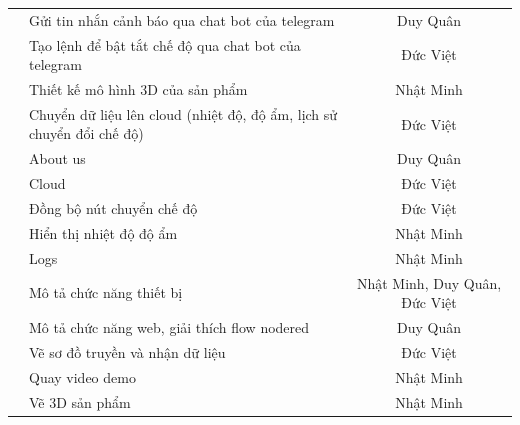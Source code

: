 \documentclass{report}
\begin{document}
\begin{table}[!h]
{\begin{tabular}{|c|l|c|}
    \rowcolor[HTML]{EBF1DE} 
    \cellcolor[HTML]{D8E4BC} & Gửi tin nhắn cảnh báo qua chat bot của telegram & Duy Quân \\ \cline{2-3} 
    \rowcolor[HTML]{EBF1DE} 
    \cellcolor[HTML]{D8E4BC} & Tạo lệnh để bật tắt chế độ qua chat bot của telegram & Đức Việt \\ \cline{2-3} 
    \rowcolor[HTML]{EBF1DE} 
    \cellcolor[HTML]{D8E4BC} & Thiết kế mô hình 3D của sản phẩm & Nhật Minh \\ \cline{2-3} 
    \rowcolor[HTML]{EBF1DE} 
    \cellcolor[HTML]{D8E4BC} & Chuyển dữ liệu lên cloud (nhiệt độ, độ ẩm, lịch sử chuyển đổi   chế độ) & Đức Việt \\ \cline{2-3} 
    \rowcolor[HTML]{EBF1DE} 
    \cellcolor[HTML]{D8E4BC} & About us & Duy Quân \\ \cline{2-3} 
    \rowcolor[HTML]{EBF1DE} 
    \cellcolor[HTML]{D8E4BC} & Cloud & Đức Việt \\ \cline{2-3} 
    \rowcolor[HTML]{EBF1DE} 
    \cellcolor[HTML]{D8E4BC} & Đồng bộ nút chuyển chế độ & Đức Việt \\ \cline{2-3} 
    \rowcolor[HTML]{EBF1DE} 
    \cellcolor[HTML]{D8E4BC} & Hiển thị nhiệt độ độ ẩm & Nhật Minh \\ \cline{2-3} 
    \rowcolor[HTML]{EBF1DE} 
    \multirow{-10}{*}{\cellcolor[HTML]{D8E4BC}\textbf{\rotatebox{90}{WEB}}} & Logs & Nhật Minh \\ \hline
    \rowcolor[HTML]{E4DFEC} 
    \cellcolor[HTML]{CCC0DA} & Mô tả chức năng thiết bị & Nhật Minh, Duy Quân, Đức Việt \\ \cline{2-3} 
    \rowcolor[HTML]{E4DFEC} 
    \cellcolor[HTML]{CCC0DA} & Mô tả chức năng web, giải thích flow nodered & Duy Quân \\ \cline{2-3} 
    \rowcolor[HTML]{E4DFEC} 
    \cellcolor[HTML]{CCC0DA} & Vẽ sơ đồ truyền và nhận dữ liệu & Đức Việt \\ \cline{2-3} 
    \rowcolor[HTML]{E4DFEC} 
    \cellcolor[HTML]{CCC0DA} & Quay video demo & Nhật Minh \\ \cline{2-3} 
    \rowcolor[HTML]{E4DFEC} 
    \multirow{-5}{*}{\cellcolor[HTML]{CCC0DA}\textbf{\rotatebox{90}{BÁO CÁO}}} & Vẽ 3D sản phẩm & Nhật Minh \\ \hline
    \end{tabular}%
    }
\end{table}

\newpage
\end{document}
